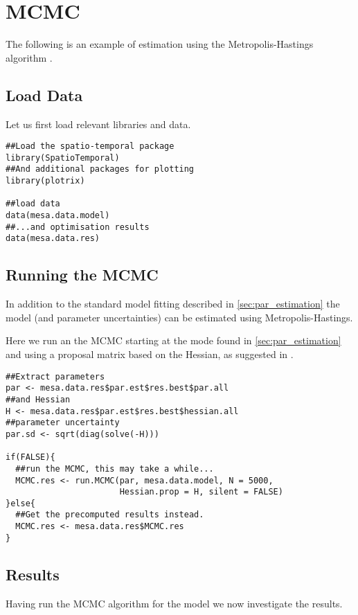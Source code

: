 \section{MCMC} \label{app:MCMC}
The following is an example of estimation using the
 Metropolis-Hastings algorithm \citep{Metropolis53,Hastings70}.

\subsection{Load Data}
Let us first load relevant libraries and data.
\vspace*{-0.5\baselineskip}
\begin{verbatim}
##Load the spatio-temporal package
library(SpatioTemporal)
##And additional packages for plotting
library(plotrix) 

##load data
data(mesa.data.model)
##...and optimisation results
data(mesa.data.res)
\end{verbatim}

\subsection{Running the MCMC}
In addition to the standard model fitting described in 
\autoref{sec:par_estimation} the model (and parameter uncertainties) 
can be estimated using Metropolis-Hastings.

Here we run an the MCMC starting at the mode found in
\autoref{sec:par_estimation} and using a proposal matrix based on the
Hessian, as suggested in \citet{Roberts97}.
\vspace*{-0.5\baselineskip}
\begin{verbatim}
##Extract parameters
par <- mesa.data.res$par.est$res.best$par.all
##and Hessian
H <- mesa.data.res$par.est$res.best$hessian.all
##parameter uncertainty
par.sd <- sqrt(diag(solve(-H)))

if(FALSE){
  ##run the MCMC, this may take a while...
  MCMC.res <- run.MCMC(par, mesa.data.model, N = 5000, 
                       Hessian.prop = H, silent = FALSE)
}else{
  ##Get the precomputed results instead.
  MCMC.res <- mesa.data.res$MCMC.res
}
\end{verbatim}

\subsection{Results}
Having run the MCMC algorithm for the model we now
investigate the results.

